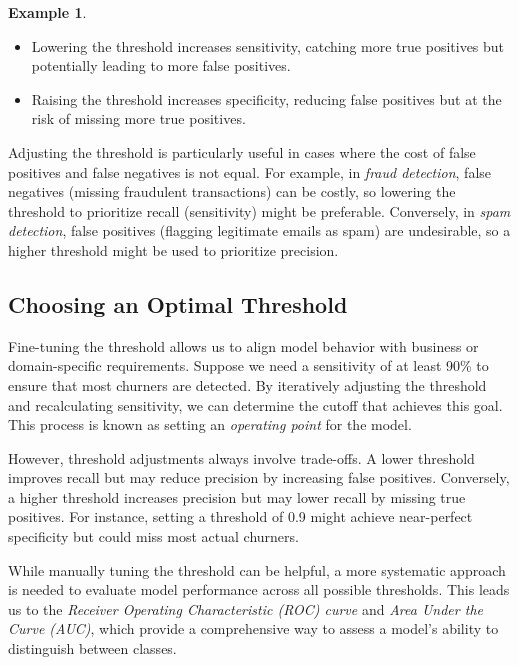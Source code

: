 \documentclass[
  11pt,
]{book}
\providecommand{\tightlist}{%
  \setlength{\itemsep}{0pt}\setlength{\parskip}{0pt}}
\theoremstyle{definition}
\theoremstyle{definition}
\newtheorem{example}{Example}[chapter]
\theoremstyle{definition}
\theoremstyle{definition}
\theoremstyle{remark}
\begin{document}
\begin{example}
\begin{itemize}
\tightlist
\item
  Lowering the threshold increases sensitivity, catching more true positives but potentially leading to more false positives.\\
\item
  Raising the threshold increases specificity, reducing false positives but at the risk of missing more true positives.
\end{itemize}

Adjusting the threshold is particularly useful in cases where the cost of false positives and false negatives is not equal. For example, in \emph{fraud detection}, false negatives (missing fraudulent transactions) can be costly, so lowering the threshold to prioritize recall (sensitivity) might be preferable. Conversely, in \emph{spam detection}, false positives (flagging legitimate emails as spam) are undesirable, so a higher threshold might be used to prioritize precision.
\end{example}

\subsection*{Choosing an Optimal Threshold}\label{choosing-an-optimal-threshold}


Fine-tuning the threshold allows us to align model behavior with business or domain-specific requirements. Suppose we need a sensitivity of at least 90\% to ensure that most churners are detected. By iteratively adjusting the threshold and recalculating sensitivity, we can determine the cutoff that achieves this goal. This process is known as setting an \emph{operating point} for the model.

However, threshold adjustments always involve trade-offs. A lower threshold improves recall but may reduce precision by increasing false positives. Conversely, a higher threshold increases precision but may lower recall by missing true positives. For instance, setting a threshold of 0.9 might achieve near-perfect specificity but could miss most actual churners.

While manually tuning the threshold can be helpful, a more systematic approach is needed to evaluate model performance across all possible thresholds. This leads us to the \emph{Receiver Operating Characteristic (ROC) curve} and \emph{Area Under the Curve (AUC)}, which provide a comprehensive way to assess a model's ability to distinguish between classes.
\end{document}
